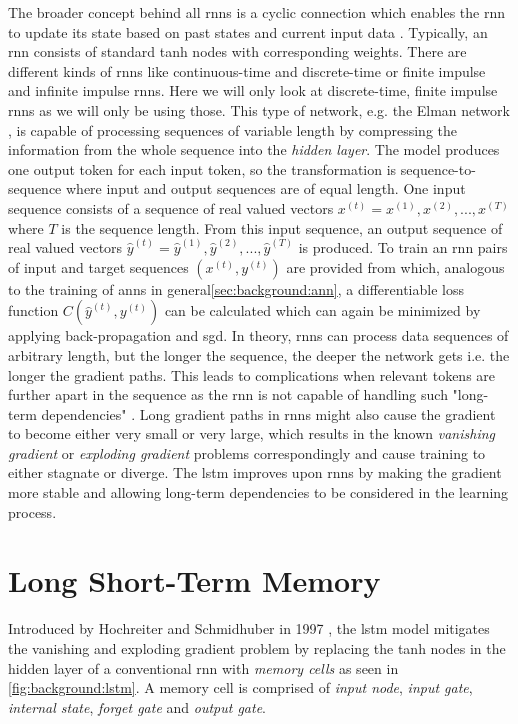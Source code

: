 The broader concept behind all \glspl{rnn} is a cyclic connection which enables the \gls{rnn} to update its state based on past states and current input data \cite{rnn_review}. Typically, an \gls{rnn} consists of standard tanh nodes with corresponding weights. There are different kinds of \glspl{rnn} like continuous-time and discrete-time or finite impulse and infinite impulse \glspl{rnn}. Here we will only look at discrete-time, finite impulse \glspl{rnn} as we will only be using those. This type of network, e.g. the Elman network \cite{rnn_elman}, is capable of processing sequences of variable length by compressing the information from the whole sequence into the \textit{hidden layer}.  The model produces one output token for each input token, so the transformation is sequence-to-sequence where input and output sequences are of equal length. One input sequence consists of a sequence of real valued vectors $x^{(t)} = x^{(1)}, x^{(2)}, ... , x^{(T)}$ where $T$ is the sequence length. From this input sequence, an output sequence of real valued vectors $\hat{y}^{(t)} = \hat{y}^{(1)}, \hat{y}^{(2)}, ... , \hat{y}^{(T)}$ is produced. To train an \gls{rnn} 
pairs of input and target sequences $(x^{(t)}, y^{(t)})$ are provided from which, analogous to the training of \glspl{ann} in general\ref{sec:background:ann}, a differentiable loss function $C(\hat{y}^{(t)}, y^{(t)})$ can be calculated which can again be minimized by applying back-propagation and \gls{sgd}. In theory, \glspl{rnn} can process data sequences of arbitrary length, but the longer the sequence, the deeper the network gets i.e. the longer the gradient paths. This leads to complications when relevant tokens are further apart in the sequence as the \gls{rnn} is not capable of handling such "long-term dependencies" \cite{rnn_review}. Long gradient paths in \glspl{rnn} might also cause the gradient to become either very small or very large, which results in the known \textit{vanishing gradient} or \textit{exploding gradient} problems correspondingly and cause training to either stagnate or diverge. The \gls{lstm} improves upon \glspl{rnn} by making the gradient more stable and allowing long-term dependencies to be considered in the learning process.

\section{Long Short-Term Memory}

Introduced by Hochreiter and Schmidhuber in 1997 \cite{lstm_origin}, the \gls{lstm} model mitigates the vanishing and exploding gradient problem by replacing the tanh nodes in the hidden layer of a conventional \gls{rnn} with \textit{memory cells} as seen in \ref{fig:background:lstm}. 
A memory cell is comprised of \textit{input node}, \textit{input gate}, \textit{internal state}, \textit{forget gate} and \textit{output gate}. 

